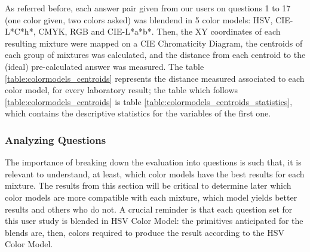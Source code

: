 %
As referred before, each answer pair given from our users on questions 1 to 17 (one color given, two colors asked) was blendend in 5 color models: HSV, CIE-L*C*h*, CMYK, RGB and CIE-L*a*b*. Then, the XY coordinates of each resulting
mixture were mapped on a CIE Chromaticity Diagram, the centroids of each group of mixtures was calculated, and the distance from each centroid to the (ideal) pre-calculated answer was measured. The table \ref{table:colormodels_centroids}
represents the distance measured associated to each color model, for every laboratory result; the table which follows \ref{table:colormodels_centroids} is table \ref{table:colormodels_centroids_statistics}, which
contains the descriptive statistics for the variables of the first one. \par
%
%
\subsubsection{Analyzing Questions}
\label{subsubsec:questions_analyzing}
%
The importance of breaking down the evaluation into questions is such that, it is relevant to understand, at least, which color models have the best results for each mixture. The results from this section will be critical
to determine later which color models are more compatible with each mixture, which model yields better results and others who do not. A crucial reminder is that each question set for this user study is blended in HSV Color
Model: the primitives anticipated for the blends are, then, colors required to produce the result according to the HSV Color Model. \par
%
